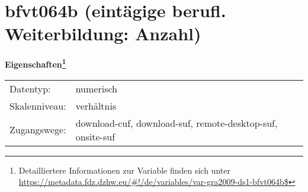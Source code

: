 
    \setcounter{footnote}{0}

    \vspace*{-1.8cm}
	\section{bfvt064b (eintägige berufl. Weiterbildung: Anzahl)}
	\label{section:bfvt064b}



    \vspace*{0.5cm}
    \noindent\textbf{Eigenschaften\footnote{Detailliertere Informationen zur Variable finden sich unter
		\url{https://metadata.fdz.dzhw.eu/\#!/de/variables/var-gra2009-ds1-bfvt064b$}}}\\
	\begin{tabularx}{\hsize}{@{}lX}
	Datentyp: & numerisch \\
	Skalenniveau: & verhältnis \\
	Zugangswege: &
	  download-cuf, 
	  download-suf, 
	  remote-desktop-suf, 
	  onsite-suf
 \\
    \end{tabularx}



